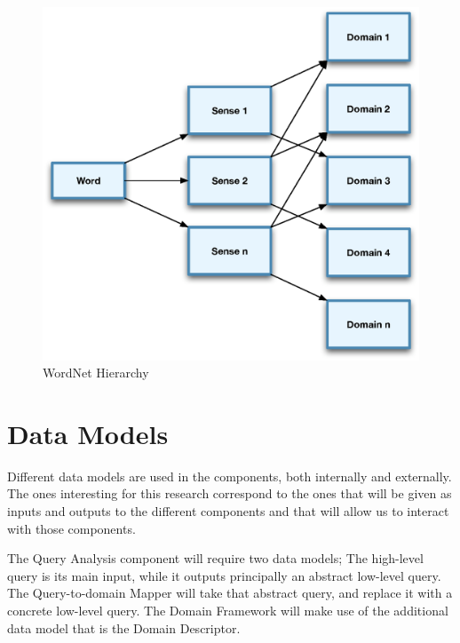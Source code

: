 \begin{figure}[ht!]
  \begin{center}
    \includegraphics[width=\linewidth]{images/wordnethierarchy}
  \end{center}
  \caption{WordNet Hierarchy}\label{fig:wordnethierarchy}
\end{figure}



\section{Data Models} %
\label{sec:data_models}
Different data models are used in the components, both internally and externally. The ones interesting for this research correspond to the ones that will be given as inputs and outputs to the different components and that will allow us to interact with those components.

The Query Analysis component will require two data models; The high-level query is its main input, while it outputs principally an abstract low-level query. The Query-to-domain Mapper will take that abstract query, and replace it with a concrete low-level query. The Domain Framework will make use of the additional data model that is the Domain Descriptor.

